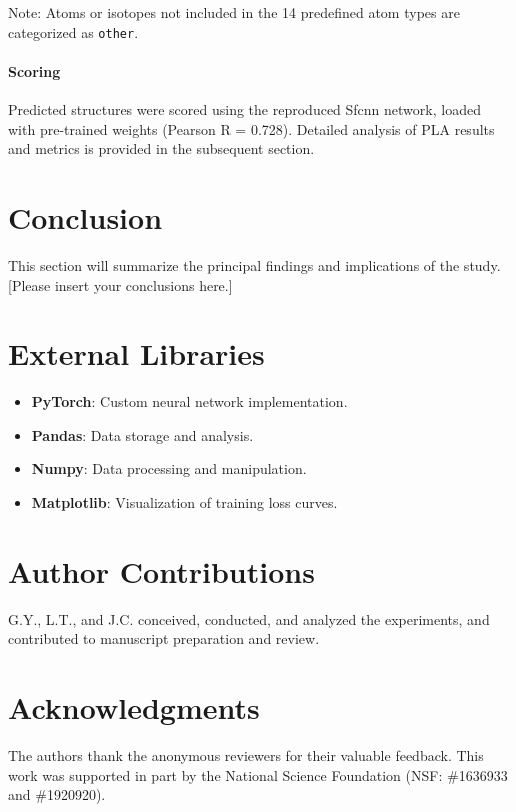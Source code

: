 \documentclass[unnumsec,webpdf,contemporary,large]{oup-authoring-template}
\theoremstyle{thmstyleone}%
\theoremstyle{thmstyletwo}%
\theoremstyle{thmstylethree}%
\begin{document}
Note: Atoms or isotopes not included in the 14 predefined atom types are categorized as \texttt{other}.

\paragraph{Scoring}

Predicted structures were scored using the reproduced Sfcnn network, loaded with pre-trained weights (Pearson R = 0.728). Detailed analysis of PLA results and metrics is provided in the subsequent section.



\section{Conclusion}
This section will summarize the principal findings and implications of the study. [Please insert your conclusions here.]

\section{External Libraries}

\begin{itemize}
    \item \textbf{PyTorch}: Custom neural network implementation.
    \item \textbf{Pandas}: Data storage and analysis.
    \item \textbf{Numpy}: Data processing and manipulation.
    \item \textbf{Matplotlib}: Visualization of training loss curves.
\end{itemize}

\section{Author Contributions}
G.Y., L.T., and J.C. conceived, conducted, and analyzed the experiments, and contributed to manuscript preparation and review.

\section{Acknowledgments}
The authors thank the anonymous reviewers for their valuable feedback. This work was supported in part by the National Science Foundation (NSF: \#1636933 and \#1920920).

% 
% 
\end{document}
